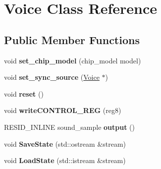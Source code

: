 \hypertarget{classVoice}{\section{Voice Class Reference}
\label{classVoice}
}
\subsection*{Public Member Functions}
\begin{DoxyCompactItemize}
\item 
\hypertarget{classVoice_a75442c46ec1942613b6a3d07df63bbfa}{void {\bfseries set\-\_\-chip\-\_\-model} (chip\-\_\-model model)}\label{classVoice_a75442c46ec1942613b6a3d07df63bbfa}

\item 
\hypertarget{classVoice_a555c1d72f38403b6d544a0973b092344}{void {\bfseries set\-\_\-sync\-\_\-source} (\hyperlink{classVoice}{Voice} $\ast$)}\label{classVoice_a555c1d72f38403b6d544a0973b092344}

\item 
\hypertarget{classVoice_a2f2a45003d0c54aa53cb80278037a3ad}{void {\bfseries reset} ()}\label{classVoice_a2f2a45003d0c54aa53cb80278037a3ad}

\item 
\hypertarget{classVoice_a042c69ee93c6b53298f23d3b19a4c260}{void {\bfseries write\-C\-O\-N\-T\-R\-O\-L\-\_\-\-R\-E\-G} (reg8)}\label{classVoice_a042c69ee93c6b53298f23d3b19a4c260}

\item 
\hypertarget{classVoice_ac1c1acb69165879fc7e903c2468fa1d7}{R\-E\-S\-I\-D\-\_\-\-I\-N\-L\-I\-N\-E sound\-\_\-sample {\bfseries output} ()}\label{classVoice_ac1c1acb69165879fc7e903c2468fa1d7}

\item 
\hypertarget{classVoice_aee59f9bf1d4173907cbdf596c69d547e}{void {\bfseries Save\-State} (std\-::ostream \&stream)}\label{classVoice_aee59f9bf1d4173907cbdf596c69d547e}

\item 
\hypertarget{classVoice_a7aa426dcc675117fd10e01f6f22b3ee5}{void {\bfseries Load\-State} (std\-::istream \&stream)}\label{classVoice_a7aa426dcc675117fd10e01f6f22b3ee5}

\end{DoxyCompactItemize}
